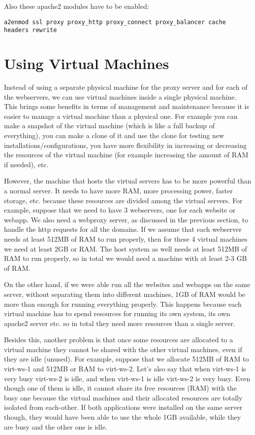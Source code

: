 \documentclass[a4paper]{article}
\begin{document}
Also these apache2 modules have to be enabled:
\begin{verbatim}
a2enmod ssl proxy proxy_http proxy_connect proxy_balancer cache headers rewrite
\end{verbatim}


\section{Using Virtual Machines}

Instead of using a separate physical machine for the proxy server and
for each of the webservers, we can use virtual machines inside a
single physical machine. This brings some benefits in terms of
management and maintenance because it is easier to manage a virtual
machine than a physical one. For example you can make a snapshot of
the virtual machine (which is like a full backup of everything), you
can make a clone of it and use the clone for testing new
installations/configurations, you have more flexibility in increasing
or decreasing the resources of the virtual machine (for example
increasing the amount of RAM if needed), etc.

However, the machine that hosts the virtual servers has to be more
powerful than a normal server. It needs to have more RAM, more
processing power, faster storage, etc. because these resources are
divided among the virtual servers. For example, suppose that we need
to have 3 webservers, one for each website or webapp. We also need a
webproxy server, as discussed in the previous section, to handle the
http requests for all the domains.  If we assume that each webserver
needs at least 512MB of RAM to run properly, then for these 4 virtual
machines we need at least 2GB or RAM. The host system as well needs at
least 512MB of RAM to run properly, so in total we would need a
machine with at least 2-3 GB of RAM.

On the other hand, if we were able run all the websites and webapps on
the same server, without separating them into different machines, 1GB
of RAM would be more than enough for running everything properly.
This happens because each virtual machine has to spend resources for
running its own system, its own apache2 server etc. so in total they
need more resources than a single server.

Besides this, another problem is that once some resources are
allocated to a virtual machine they cannot be shared with the other
virtual machines, even if they are idle (unused). For example, suppose
that we allocate 512MB of RAM to virt-ws-1 and 512MB or RAM to
virt-ws-2. Let's also say that when virt-ws-1 is very busy virt-ws-2
is idle, and when virt-ws-1 is idle virt-ws-2 is very busy. Even
though one of them is idle, it cannot share its free resources (RAM)
with the busy one because the virtual machines and their allocated
resources are totally isolated from each-other. If both applications
were installed on the same server though, they would have been able to
use the whole 1GB available, while they are busy and the other one is
idle.
\end{document}
